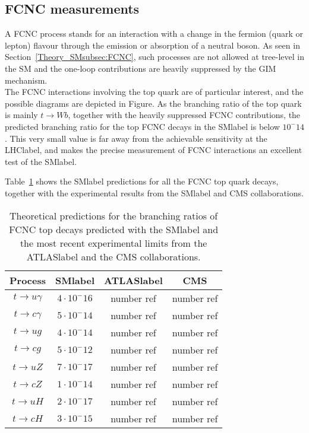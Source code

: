 \clearpage
\subsection{FCNC measurements}

A FCNC process stands for an interaction with a change in the fermion (quark or lepton) flavour through
the emission or absorption of a neutral boson. As seen in Section~\ref{Theory_SMsubsec:FCNC}, such processes are not allowed at tree-level in the SM and the one-loop contributions are heavily suppressed by the GIM mechanism.\\

The FCNC interactions involving the top quark are of particular interest, and the possible diagrams are depicted in Figure. As the branching ratio of the top quark is mainly $t\to Wb$, together with the heavily suppressed FCNC contributions, the predicted branching ratio for the top FCNC decays in the \acrshort{SMlabel} is below $10^-14$. This very small value is far away from the achievable sensitivity at the \acrshort{LHClabel}, and makes the precise measurement of FCNC interactions an excellent test of the \acrshort{SMlabel}.

Table~\ref{tabSM:FCNCmeasurements} shows the \acrshort{SMlabel} predictions for all the FCNC top quark decays, together with the experimental results from the \acrshort{SMlabel} and CMS collaborations.

\begin{table}[htbp]
    \begin{tabular}{c|c|cc}
    \toprule\toprule
    Process & \acrshort{SMlabel} & \acrshort{ATLASlabel} & CMS \\ \midrule
    $t\to u\gamma$  & $4\cdot 10^-16$ &  number ref  & number ref \\ 
    $t\to c\gamma$  & $5\cdot 10^-14$ &  number ref  & number ref \\ \midrule
    $t\to ug$  & $4\cdot 10^-14$ &  number ref  & number ref \\ 
    $t\to cg$  & $5\cdot 10^-12$ &  number ref  & number ref \\ \midrule
    $t\to uZ$  & $7\cdot 10^-17$ &  number ref  & number ref \\ 
    $t\to cZ$  & $1\cdot 10^-14$ &  number ref  & number ref \\ \midrule
    $t\to uH$  & $2\cdot 10^-17$ &  number ref  & number ref \\ 
    $t\to cH$  & $3\cdot 10^-15$ &  number ref  & number ref \\ \midrule
    \bottomrule\bottomrule
    \end{tabular}
    \caption{Theoretical predictions for the branching ratios of FCNC top decays predicted with the \acrshort{SMlabel} and the most recent experimental limits from the \acrshort{ATLASlabel} and the CMS collaborations.}
    \label{tabSM:FCNCmeasurements}
    \end{table}

